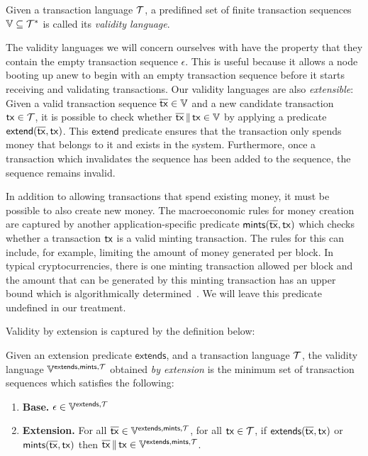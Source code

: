 \begin{definition}
  Given a transaction language $\mathcal{T}$, a predifined set of finite
  transaction sequences $\mathbb{V} \subseteq \mathcal{T}^*$ is called its
  \emph{validity language}.
\end{definition}

The validity languages we will concern ourselves with have the property that
they contain the empty transaction sequence $\epsilon$. This is useful because
it allows a node booting up anew to begin with an empty transaction sequence
before it starts receiving and validating transactions. Our validity languages
are also \emph{extensible}: Given a valid transaction sequence $\overline{\mathsf{tx}}
\in \mathbb{V}$ and a new candidate transaction $\mathsf{tx} \in \mathcal{T}$, it is
possible to check whether $\overline{\mathsf{tx}} \,\|\, \mathsf{tx} \in \mathbb{V}$ by applying
a predicate $\textsf{extend}(\overline{\mathsf{tx}}, \mathsf{tx})$. This $\textsf{extend}$
predicate ensures that the transaction only spends money that belongs to it and
exists in the system. Furthermore, once a
transaction which invalidates the sequence has been added to the sequence, the
sequence remains invalid.

In addition to allowing transactions that spend existing money, it must be
possible to also create new money. The macroeconomic rules for money creation
are captured by another application-specific predicate
$\textsf{mints}(\overline{\mathsf{tx}}, \mathsf{tx})$ which checks whether a transaction $\mathsf{tx}$
is a valid minting transaction. The rules for this can include, for example,
limiting the amount of money generated per block.
In typical cryptocurrencies, there is one minting transaction allowed per block
and the amount that can be generated by this minting transaction has an
upper bound which is algorithmically determined~\cite{equitability}.
We will leave this predicate undefined in our treatment.

Validity by extension is captured by the definition below:

\begin{definition}\label{def:lang-extension}
  Given an extension predicate $\textsf{extends}$, and a transaction language
  $\mathcal{T}$, the validity language
  $\mathbb{V}^{\textsf{extends},\textsf{mints},\mathcal{T}}$ obtained \emph{by extension} is
  the minimum set of transaction sequences which satisfies the following:

  \begin{enumerate}
    \item \textbf{Base.}
          $\epsilon \in \mathbb{V}^{\textsf{extends},\mathcal{T}}$
    \item \textbf{Extension.}
          For all $\overline{\mathsf{tx}} \in \mathbb{V}^{\textsf{extends},\textsf{mints},\mathcal{T}}$, for all
          $\mathsf{tx} \in \mathcal{T}$, if
          $\textsf{extends}(\overline{\mathsf{tx}}, \mathsf{tx})$ or $\textsf{mints}(\overline{\mathsf{tx}}, \mathsf{tx})$ then
          $\overline{\mathsf{tx}} \,\|\, \mathsf{tx} \in \mathbb{V}^{\textsf{extends},\textsf{mints},\mathcal{T}}$.
  \end{enumerate}
\end{definition}

